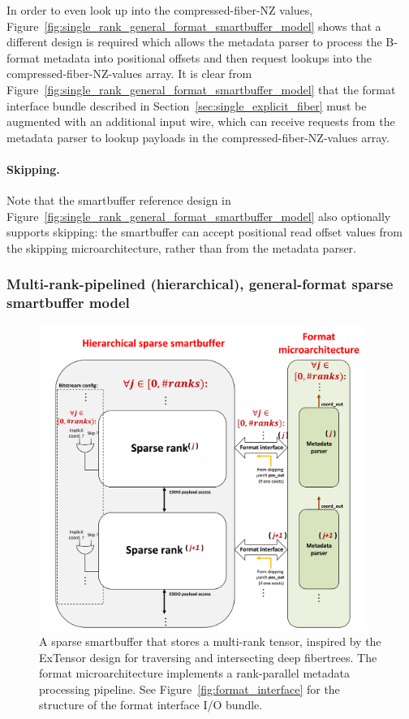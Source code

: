 In order to even look up into the compressed-fiber-NZ values, Figure~\ref{fig:single_rank_general_format_smartbuffer_model} shows that a different design is required which allows the metadata parser to process the B-format metadata into positional offsets and then request lookups into the compressed-fiber-NZ-values array. It is clear from Figure~\ref{fig:single_rank_general_format_smartbuffer_model} that the format interface bundle described in Section~\ref{sec:single_explicit_fiber} must be augmented with an additional input wire, which can receive requests from the metadata parser to lookup payloads in the compressed-fiber-NZ-values array.

\paragraph{Skipping.} Note that the smartbuffer reference design in Figure~\ref{fig:single_rank_general_format_smartbuffer_model} also optionally supports skipping: the smartbuffer can accept positional read offset values from the skipping microarchitecture, rather than from the metadata parser.

\subsubsection{Multi-rank-pipelined (hierarchical), general-format sparse smartbuffer model}

\begin{figure}[ht]
    \centering
    \includegraphics[width=0.95\textwidth]{figures/hierarchical_general_format_sparse_smartbuffer.png}
    \caption{A sparse smartbuffer that stores a multi-rank tensor, inspired by the ExTensor\cite{extensor} design for traversing and intersecting deep fibertrees. The format microarchitecture implements a rank-parallel metadata processing pipeline. See Figure~\ref{fig:format_interface} for the structure of the format interface I/O bundle.}
    \label{fig:hierarchical_general_format_sparse_smartbuffer}
\end{figure}

